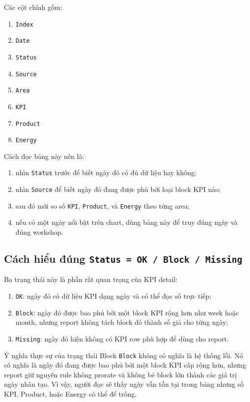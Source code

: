 Các cột chính gồm:

\begin{enumerate}[label=-]
\item \texttt{Index}
\item \texttt{Date}
\item \texttt{Status}
\item \texttt{Source}
\item \texttt{Area}
\item \texttt{KPI}
\item \texttt{Product}
\item \texttt{Energy}
\end{enumerate}

Cách đọc bảng này nên là:

\begin{enumerate}[label=-]
\item nhìn \texttt{Status} trước để biết ngày đó có đủ dữ liệu hay không;
\item nhìn \texttt{Source} để biết ngày đó đang được phủ bởi loại block KPI nào;
\item sau đó mới so số \texttt{KPI}, \texttt{Product}, và \texttt{Energy} theo từng area;
\item nếu có một ngày nổi bật trên chart, dùng bảng này để truy đúng ngày và đúng workshop.
\end{enumerate}

\subsection{Cách hiểu đúng \texttt{Status = OK / Block / Missing}}

Ba trạng thái này là phần rất quan trọng của KPI detail:

\begin{enumerate}[label=-]
\item \texttt{OK}: ngày đó có dữ liệu KPI dạng ngày và có thể đọc số trực tiếp;
\item \texttt{Block}: ngày đó được bao phủ bởi một block KPI rộng hơn như week hoặc month, nhưng report không tách block đó thành số giả cho từng ngày;
\item \texttt{Missing}: ngày đó hiện không có KPI row phù hợp để dùng cho report.
\end{enumerate}

\begin{ReaderNote}{Ý nghĩa thực sự của trạng thái Block}
\texttt{Block} không có nghĩa là hệ thống lỗi. Nó có nghĩa là ngày đó đang được bao phủ bởi một block KPI cấp rộng hơn, nhưng report giữ nguyên rule không prorate và không bẻ block lớn thành các giá trị ngày nhân tạo. Vì vậy, người đọc sẽ thấy ngày vẫn tồn tại trong bảng nhưng số KPI, Product, hoặc Energy có thể để trống.
\end{ReaderNote}

